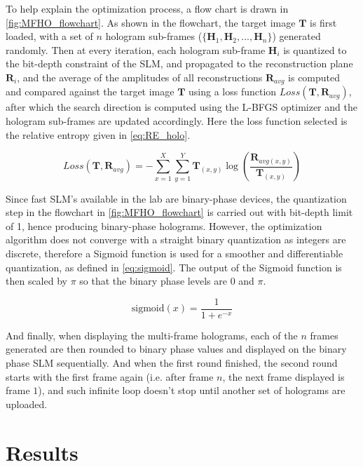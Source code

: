 	To help explain the optimization process, a flow chart is drawn in \cref{fig:MFHO_flowchart}. As shown in the flowchart, the target image $\textbf{T}$ is first loaded, with a set of $n$ hologram sub-frames ($\{\textbf{H}_1, \textbf{H}_2, ..., \textbf{H}_n\}$) generated randomly. Then at every iteration, each hologram sub-frame $\textbf{H}_i$ is quantized to the bit-depth constraint of the SLM, and propagated to the reconstruction plane $\textbf{R}_i$, and the average of the amplitudes of all reconstructions $\textbf{R}_{avg}$ is computed and compared against the target image $\textbf{T}$ using a loss function $Loss(\textbf{T}, \textbf{R}_{avg})$, after which the search direction is computed using the L-BFGS optimizer and the hologram sub-frames are updated accordingly. Here the loss function selected is the relative entropy\cite{Kullback1951} given in \cref{eq:RE_holo}.
	
	\begin{equation}
		Loss(\textbf{T}, \textbf{R}_{avg}) = -\sum_{x=1}^{X} \sum_{y=1}^{Y} \textbf{T}_{(x,y)}\log\left(\frac{\textbf{R}_{avg(x,y)}}{\textbf{T}_{(x,y)}}\right)
		\label{eq:RE_holo}
	\end{equation}
	
	Since fast SLM's available in the lab are binary-phase devices, the quantization step in the flowchart in \cref{fig:MFHO_flowchart} is carried out with bit-depth limit of 1, hence producing binary-phase holograms. However, the optimization algorithm does not converge with a straight binary quantization as integers are discrete, therefore a Sigmoid function \cite{Bacaer2011} is used for a smoother and differentiable quantization, as defined in \cref{eq:sigmoid}. The output of the Sigmoid function is then scaled by $\pi$ so that the binary phase levels are $0$ and $\pi$. 
	
	\begin{equation}
		\mathrm{sigmoid}(x)=\frac{1}{1+e^{-x}}
		\label{eq:sigmoid}
	\end{equation}
	
	And finally, when displaying the multi-frame holograms, each of the $n$ frames generated are then rounded to binary phase values and displayed on the binary phase SLM sequentially. And when the first round finished, the second round starts with the first frame again (i.e. after frame $n$, the next frame displayed is frame $1$), and such infinite loop doesn't stop until another set of holograms are uploaded.
	
\section{Results}
	
